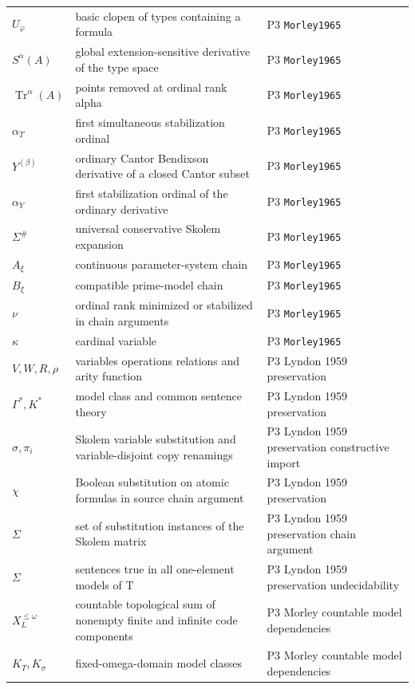 \begin{longtable}{@{}p{}p{}p{}@{}}
\(U_\varphi\) & basic clopen of types containing a formula & P3 \texttt{Morley1965} \\
\(S^\alpha(A)\) & global extension-sensitive derivative of the type space & P3 \texttt{Morley1965} \\
\(\operatorname{Tr}^\alpha(A)\) & points removed at ordinal rank alpha & P3 \texttt{Morley1965} \\
\(\alpha_T\) & first simultaneous stabilization ordinal & P3 \texttt{Morley1965} \\
\(Y^{(\beta)}\) & ordinary Cantor Bendixson derivative of a closed Cantor subset & P3 \texttt{Morley1965} \\
\(\alpha_Y\) & first stabilization ordinal of the ordinary derivative & P3 \texttt{Morley1965} \\
\(\Sigma^\#\) & universal conservative Skolem expansion & P3 \texttt{Morley1965} \\
\(A_\xi\) & continuous parameter-system chain & P3 \texttt{Morley1965} \\
\(B_\xi\) & compatible prime-model chain & P3 \texttt{Morley1965} \\
\(\nu\) & ordinal rank minimized or stabilized in chain arguments & P3 \texttt{Morley1965} \\
\(\kappa\) & cardinal variable & P3 \texttt{Morley1965} \\
\(V,\allowbreak W,\allowbreak R,\allowbreak \rho\) & variables operations relations and arity function & P3 Lyndon 1959 preservation \\
\(\Gamma^*,\allowbreak K^*\) & model class and common sentence theory & P3 Lyndon 1959 preservation \\
\(\sigma,\allowbreak \pi_i\) & Skolem variable substitution and variable-disjoint copy renamings & P3 Lyndon 1959 preservation constructive import \\
\(\chi\) & Boolean substitution on atomic formulas in source chain argument & P3 Lyndon 1959 preservation \\
\(\Sigma\) & set of substitution instances of the Skolem matrix & P3 Lyndon 1959 preservation chain argument \\
\(\Sigma\) & sentences true in all one-element models of T & P3 Lyndon 1959 preservation undecidability \\
\(X_L^{\leq\omega}\) & countable topological sum of nonempty finite and infinite code components & P3 Morley countable model dependencies \\
\(K_T,\allowbreak K_\sigma\) & fixed-omega-domain model classes & P3 Morley countable model dependencies \\

\end{longtable}
